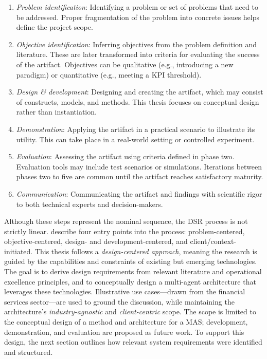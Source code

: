 \begin{enumerate}
    \item \emph{Problem identification}: Identifying a problem or set of problems that need to be addressed. Proper fragmentation of the problem into concrete issues helps define the project scope.
    \item \emph{Objective identification}: Inferring objectives from the problem definition and literature. These are later transformed into criteria for evaluating the success of the artifact. Objectives can be qualitative (e.g., introducing a new paradigm) or quantitative (e.g., meeting a KPI threshold).
    \item \emph{Design \& development}: Designing and creating the artifact, which may consist of constructs, models, and methods. This thesis focuses on conceptual design rather than instantiation.
    \item \emph{Demonstration}: Applying the artifact in a practical scenario to illustrate its utility. This can take place in a real-world setting or controlled experiment.
    \item \emph{Evaluation}: Assessing the artifact using criteria defined in phase two. Evaluation tools may include test scenarios or simulations. Iterations between phases two to five are common until the artifact reaches satisfactory maturity.
    \item \emph{Communication}: Communicating the artifact and findings with scientific rigor to both technical experts and decision-makers.
\end{enumerate}

Although these steps represent the nominal sequence, the DSR process is not strictly linear. \textcite[2007][pp. 52--56]{peffersDesignScienceMethodology2007} describe four entry points into the process: problem-centered, objective-centered, design- and development-centered, and client/context-initiated. This thesis follows a \emph{design-centered approach}, meaning the research is guided by the capabilities and constraints of existing but emerging technologies. The goal is to derive design requirements from relevant literature and operational excellence principles, and to conceptually design a multi-agent architecture that leverages these technologies. Illustrative use cases---drawn from the financial services sector---are used to ground the discussion, while maintaining the architecture’s \emph{industry-agnostic} and \emph{client-centric} scope. The scope is limited to the conceptual design of a method and architecture for a MAS; development, demonstration, and evaluation are proposed as future work. To support this design, the next section outlines how relevant system requirements were identified and structured.


